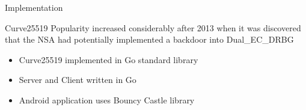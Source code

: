\documentclass[aspectratio=169]{beamer}
\begin{document}
  \begin{frame}{Implementation}
    \begin{figure}
      \centering
    \end{figure}
  \end{frame}

  \begin{frame}{Curve25519}
    Popularity increased considerably after 2013 when it was discovered that the NSA had potentially implemented a backdoor into Dual\_EC\_DRBG
    \begin{itemize}
      \item Curve25519 implemented in Go standard library
      \item Server and Client written in Go
      \item Android application uses Bouncy Castle library
    \end{itemize}
  \end{frame}
  
\end{document}
